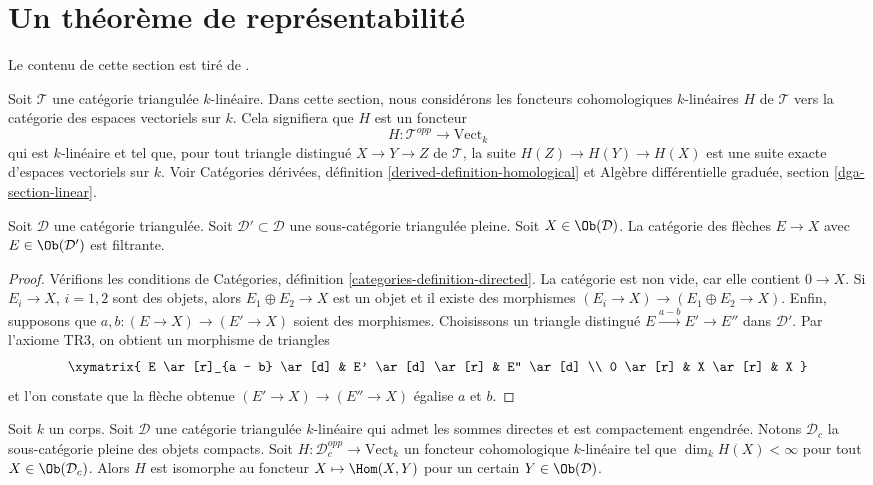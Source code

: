 \section{Un théorème de représentabilité}
\label{section-bondal-van-den-bergh}

\noindent
Le contenu de cette section est tiré de \cite{BvdB}.

\medskip\noindent
Soit $\mathcal{T}$ une catégorie triangulée $k$-linéaire.
Dans cette section, nous considérons les foncteurs cohomologiques $k$-linéaires
$H$ de $\mathcal{T}$ vers la catégorie des espaces vectoriels sur $k$.
Cela signifiera que $H$ est un foncteur
$$
H : \mathcal{T}^{opp} \longrightarrow \text{Vect}_k
$$
qui est $k$-linéaire et tel que, pour tout triangle distingué
$X \to Y \to Z$ de $\mathcal{T}$, la suite $H(Z) \to H(Y) \to H(X)$
est une suite exacte d'espaces vectoriels sur $k$. Voir
Catégories dérivées, définition \ref{derived-definition-homological}
et Algèbre différentielle graduée, section \ref{dga-section-linear}.

\begin{lemma}
\label{lemma-maps-from-compact-filtered}
Soit $\mathcal{D}$ une catégorie triangulée. Soit
$\mathcal{D}' \subset \mathcal{D}$ une sous-catégorie triangulée pleine. Soit
$X \in \Ob(\mathcal{D})$. La catégorie des flèches $E \to X$ avec
$E \in \Ob(\mathcal{D}')$ est filtrante.
\end{lemma}

\begin{proof}
Vérifions les conditions de
Catégories, définition \ref{categories-definition-directed}.
La catégorie est non vide, car elle contient $0 \to X$.
Si $E_i \to X$, $i = 1, 2$ sont des objets, alors $E_1 \oplus E_2 \to X$
est un objet et il existe des morphismes $(E_i \to X) \to (E_1 \oplus E_2 \to X)$.
Enfin, supposons que $a, b : (E \to X) \to (E' \to X)$ soient des morphismes.
Choisissons un triangle distingué $E \xrightarrow{a - b} E' \to E''$
dans $\mathcal{D}'$. Par l'axiome TR3, on obtient un morphisme de triangles
$$
\xymatrix{
E \ar[r]_{a - b} \ar[d] &
E' \ar[d] \ar[r] & E'' \ar[d] \\
0 \ar[r] &
X \ar[r] &
X
}
$$
et l'on constate que la flèche obtenue $(E' \to X) \to (E'' \to X)$
égalise $a$ et $b$.
\end{proof}

\begin{lemma}
\label{lemma-van-den-bergh}
\begin{reference}
\cite[Lemme 2.14]{CKN}
\end{reference}
Soit $k$ un corps. Soit $\mathcal{D}$ une catégorie triangulée $k$-linéaire
qui admet les sommes directes et est compactement engendrée.
Notons $\mathcal{D}_c$ la sous-catégorie pleine
des objets compacts. Soit $H : \mathcal{D}_c^{opp} \to \text{Vect}_k$
un foncteur cohomologique $k$-linéaire tel que
$\dim_k H(X) < \infty$ pour tout $X \in \Ob(\mathcal{D}_c)$.
Alors $H$ est isomorphe au foncteur $X \mapsto \Hom(X, Y)$
pour un certain $Y \in \Ob(\mathcal{D})$.
\end{lemma}

